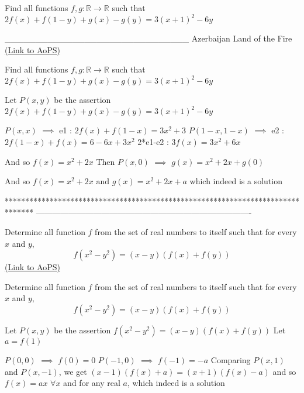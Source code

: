 \begin{problem}
	Find all functions $f,g: \mathbb{R}\to\mathbb{R}$ such that
$2f(x)+f(1-y)+g(x)-g(y)=3(x+1)^2-6y$


______________________________
Azerbaijan Land of the Fire 
	\flushright \href{https://artofproblemsolving.com/community/c6h463523}{(Link to AoPS)}
\end{problem}



\begin{solution}
	\begin{tcolorbox}Find all functions $f,g: \mathbb{R}\to\mathbb{R}$ such that
$2f(x)+f(1-y)+g(x)-g(y)=3(x+1)^2-6y$\end{tcolorbox}
Let $P(x,y)$ be the assertion $2f(x)+f(1-y)+g(x)-g(y)=3(x+1)^2-6y$

$P(x,x) $ $\implies$ e1 : $2f(x)+f(1-x)=3x^2+3$
$P(1-x,1-x) $ $\implies$ e2 : $2f(1-x)+f(x)=6-6x+3x^2$
2*e1-e2 : $3f(x)=3x^2+6x$ 

And so $f(x)=x^2+2x$
Then $P(x,0)$ $\implies$ $g(x)=x^2+2x+g(0)$


And so $\boxed{f(x)=x^2+2x\text{ and }g(x)=x^2+2x+a}$ which indeed is a solution
\end{solution}
*******************************************************************************
-------------------------------------------------------------------------------

\begin{problem}
	Determine all function $f$ from the set of real numbers to itself such that for every $x$ and $y$,
\[f(x^2-y^2)=(x-y)(f(x)+f(y))\]
	\flushright \href{https://artofproblemsolving.com/community/c6h463664}{(Link to AoPS)}
\end{problem}



\begin{solution}
	\begin{tcolorbox}Determine all function $f$ from the set of real numbers to itself such that for every $x$ and $y$,
\[f(x^2-y^2)=(x-y)(f(x)+f(y))\]\end{tcolorbox}
Let $P(x,y)$ be the assertion $f(x^2-y^2)=(x-y)(f(x)+f(y))$
Let $a=f(1)$

$P(0,0)$ $\implies$ $f(0)=0$
$P(-1,0)$ $\implies$ $f(-1)=-a$
Comparing $P(x,1)$ and $P(x,-1)$, we get $(x-1)(f(x)+a)=(x+1)(f(x)-a)$ and so  $\boxed{f(x)=ax}$ $\forall x$ and for any real $a$, which indeed is a solution
\end{solution}



